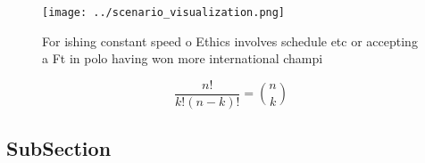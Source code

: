 \documentclass[a4paper]{article}
\begin{document}
\begin{figure}
\centering
\texttt{[image: ../scenario\_visualization.png]}
\caption{For ishing constant speed o Ethics involves schedule etc or accepting a Ft in polo having won more international champi
}
\end{figure}
 
\[ \frac{n!}{k!(n-k)!} = \binom{n}{k} \]

\subsection{SubSection}
\end{document}
